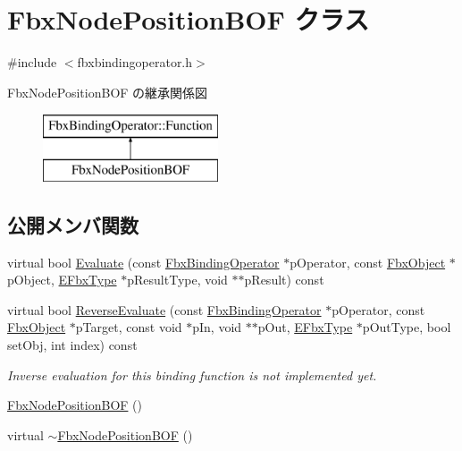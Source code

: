 \hypertarget{class_fbx_node_position_b_o_f}{}\section{Fbx\+Node\+Position\+B\+OF クラス}
\label{class_fbx_node_position_b_o_f}


{\ttfamily \#include $<$fbxbindingoperator.\+h$>$}

Fbx\+Node\+Position\+B\+OF の継承関係図\begin{figure}[H]
\begin{center}
\leavevmode
\includegraphics[height=2.000000cm]{class_fbx_node_position_b_o_f}
\end{center}
\end{figure}
\subsection*{公開メンバ関数}
\begin{DoxyCompactItemize}
\item 
virtual bool \hyperlink{class_fbx_node_position_b_o_f_ac2f916b57120cd4ba7d6df7a55a180c2}{Evaluate} (const \hyperlink{class_fbx_binding_operator}{Fbx\+Binding\+Operator} $\ast$p\+Operator, const \hyperlink{class_fbx_object}{Fbx\+Object} $\ast$p\+Object, \hyperlink{fbxpropertytypes_8h_a73913a5ddfb20e57c6f25e9e6784bd92}{E\+Fbx\+Type} $\ast$p\+Result\+Type, void $\ast$$\ast$p\+Result) const
\item 
virtual bool \hyperlink{class_fbx_node_position_b_o_f_a1f42ed86523fe35e64c63ee1c85dc22a}{Reverse\+Evaluate} (const \hyperlink{class_fbx_binding_operator}{Fbx\+Binding\+Operator} $\ast$p\+Operator, const \hyperlink{class_fbx_object}{Fbx\+Object} $\ast$p\+Target, const void $\ast$p\+In, void $\ast$$\ast$p\+Out, \hyperlink{fbxpropertytypes_8h_a73913a5ddfb20e57c6f25e9e6784bd92}{E\+Fbx\+Type} $\ast$p\+Out\+Type, bool set\+Obj, int index) const
\begin{DoxyCompactList}\small\item\em Inverse evaluation for this binding function is not implemented yet. \end{DoxyCompactList}\item 
\hyperlink{class_fbx_node_position_b_o_f_a3aa291cede0af3b651fe2dbc57914ff6}{Fbx\+Node\+Position\+B\+OF} ()
\item 
virtual \hyperlink{class_fbx_node_position_b_o_f_af99d0ed70d8a877472932fa6ccb39199}{$\sim$\+Fbx\+Node\+Position\+B\+OF} ()
\end{DoxyCompactItemize}
